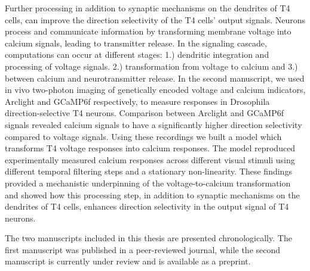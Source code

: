 Further processing in addition to synaptic mechanisms on the dendrites of T4 cells, can improve the direction selectivity of the T4 cells' output signals. Neurons process and communicate information by transforming membrane voltage into calcium signals, leading to transmitter release. In the signaling cascade, computations can occur at different stages: 1.) dendritic integration and processing of voltage signals. 2.) transformation from voltage to calcium and 3.) between calcium and neurotransmitter release. In the second manuscript, we used in vivo two-photon imaging of genetically encoded voltage and calcium indicators, Arclight and GCaMP6f respectively, to measure responses in Drosophila direction-selective T4 neurons. Comparison between Arclight and GCaMP6f signals revealed calcium signals to have a significantly higher direction selectivity compared to voltage signals. Using these recordings we built a model which transforms T4 voltage responses into calcium responses. The model reproduced experimentally measured calcium responses across different visual stimuli using different temporal filtering steps and a stationary non-linearity. These findings provided a mechanistic underpinning of the voltage-to-calcium transformation and showed how this processing step, in addition to synaptic mechanisms on the dendrites of T4 cells, enhances direction selectivity in the output signal of T4 neurons.

The two manuscripts included in this thesis are presented chronologically. The first manuscript was published in a peer-reviewed journal, while the second manuscript is currently under review and is available as a preprint. 


% 


\vfill


\endgroup			

\vfill

